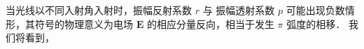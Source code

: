 
\begin{issues}

\end{issues}


当光线以不同入射角入射时，振幅反射系数 $r$ 与 振幅透射系数 $p$ 可能出现负数情形，其符号的物理意义为电场 $\boldsymbol{E}$ 的相应分量反向，相当于发生 $\pi$ 弧度的相移．
我们将看到，